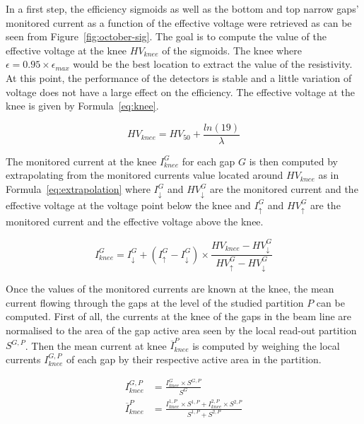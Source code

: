 	In a first step, the efficiency sigmoids as well as the bottom and top narrow gaps' monitored current as a function of the effective voltage were retrieved as can be seen from Figure~\ref{fig:october-sig}. The goal is to compute the value of the effective voltage at the knee $HV_{knee}$ of the sigmoids. The knee where $\epsilon = 0.95 \times \epsilon_{max}$ would be the best location to extract the value of the resistivity. At this point, the performance of the detectors is stable and a little variation of voltage does not have a large effect on the efficiency. The effective voltage at the knee is given by Formula~\ref{eq:knee}.
	
	\begin{equation}
	\label{eq:knee}
	HV_{knee} = HV_{50} + \frac{ln(19)}{\lambda}
	\end{equation}
	
	The monitored current at the knee $I_{knee}^{G}$ for each gap $G$ is then computed by extrapolating from the monitored currents value located around $HV_{knee}$ as in Formula~\ref{eq:extrapolation} where $I_{\downarrow}^{G}$ and $HV_{\downarrow}^{G}$ are the monitored current and the effective voltage at the voltage point below the knee and $I_{\uparrow}^{G}$ and $HV_{\uparrow}^{G}$ are the monitored current and the effective voltage above the knee.
	
	\begin{equation}
	\label{eq:extrapolation}
	I_{knee}^{G} = I_{\downarrow}^{G} + (I_{\uparrow}^{G} - I_{\downarrow}^{G})\times\frac{HV_{knee}-HV_{\downarrow}^{G}}{HV_{\uparrow}^{G} - HV_{\downarrow}^{G}}
	\end{equation}
	
	Once the values of the monitored currents are known at the knee, the mean current flowing through the gaps at the level of the studied partition $P$ can be computed. First of all, the currents at the knee of the gaps in the beam line are normalised to the area of the gap active area seen by the local read-out partition $S^{G,P}$. Then the mean current at knee $\overline{I}_{knee}^{P}$ is computed by weighing the local currents $I_{knee}^{G,P}$ of each gap by their respective active area in the partition.
	
	\begin{equation}
	\label{eq:meanI}
		\begin{aligned}
	I_{knee}^{G,P} &= \frac{I_{knee}^{G} \times S^{G,P}}{S^{G}}\\
	\overline{I}_{knee}^{P} &= \frac{I_{knee}^{1,P}\times S^{1,P} + I_{knee}^{2,P}\times S^{2,P}}{S^{1,P} + S^{2,P}}
		\end{aligned}
	\end{equation}
	
